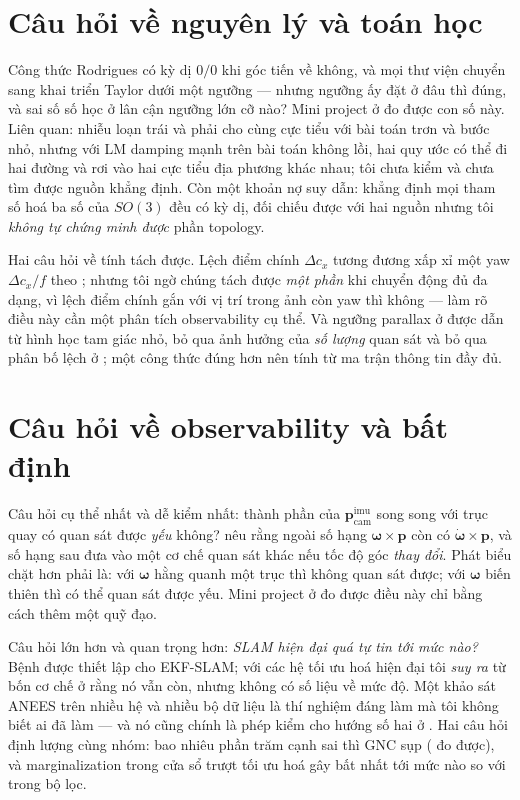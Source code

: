 \documentclass[vslam.tex]{subfiles}
\begin{document}
\section*{Câu hỏi về nguyên lý và toán học}

Công thức Rodrigues có kỳ dị \(0/0\) khi góc tiến về không, và mọi thư viện chuyển sang khai triển Taylor dưới một ngưỡng --- nhưng ngưỡng ấy đặt ở đâu thì đúng, và sai số số học ở lân cận ngưỡng lớn cỡ nào? Mini project ở  đo được con số này. Liên quan: nhiễu loạn trái và phải cho cùng cực tiểu với bài toán trơn và bước nhỏ, nhưng với LM damping mạnh trên bài toán không lồi, hai quy ước có thể đi hai đường và rơi vào hai cực tiểu địa phương khác nhau; tôi chưa kiểm và chưa tìm được nguồn khẳng định. Còn một khoản nợ suy dẫn:  khẳng định mọi tham số hoá ba số của \(SO(3)\) đều có kỳ dị, đối chiếu được với hai nguồn nhưng tôi \emph{không tự chứng minh được} phần topology.

Hai câu hỏi về tính tách được. Lệch điểm chính \(\Delta c_x\) tương đương xấp xỉ một yaw \(\Delta c_x/f\) theo ; nhưng tôi ngờ chúng tách được \emph{một phần} khi chuyển động đủ đa dạng, vì lệch điểm chính gắn với vị trí trong ảnh còn yaw thì không --- làm rõ điều này cần một phân tích observability cụ thể. Và ngưỡng parallax ở  được dẫn từ hình học tam giác nhỏ, bỏ qua ảnh hưởng của \emph{số lượng} quan sát và bỏ qua phân bố lệch ở ; một công thức đúng hơn nên tính từ ma trận thông tin đầy đủ.

\section*{Câu hỏi về observability và bất định}

Câu hỏi cụ thể nhất và dễ kiểm nhất: thành phần của \(\mathbf{p}_{\text{cam}}^{\text{imu}}\) song song với trục quay có quan sát được \emph{yếu} không?  nêu rằng ngoài số hạng \(\boldsymbol{\omega}\times\mathbf{p}\) còn có \(\dot{\boldsymbol{\omega}}\times\mathbf{p}\), và số hạng sau đưa vào một cơ chế quan sát khác nếu tốc độ góc \emph{thay đổi}. Phát biểu chặt hơn phải là: với \(\boldsymbol{\omega}\) hằng quanh một trục thì không quan sát được; với \(\boldsymbol{\omega}\) biến thiên thì có thể quan sát được yếu. Mini project ở  đo được điều này chỉ bằng cách thêm một quỹ đạo.

Câu hỏi lớn hơn và quan trọng hơn: \emph{SLAM hiện đại quá tự tin tới mức nào?} Bệnh được thiết lập cho EKF-SLAM; với các hệ tối ưu hoá hiện đại tôi \emph{suy ra} từ bốn cơ chế ở  rằng nó vẫn còn, nhưng không có số liệu về mức độ. Một khảo sát ANEES trên nhiều hệ và nhiều bộ dữ liệu là thí nghiệm đáng làm mà tôi không biết ai đã làm --- và nó cũng chính là phép kiểm cho hướng số hai ở . Hai câu hỏi định lượng cùng nhóm: bao nhiêu phần trăm cạnh sai thì GNC sụp ( đo được), và marginalization trong cửa sổ trượt tối ưu hoá gây bất nhất tới mức nào so với trong bộ lọc.
\end{document}
